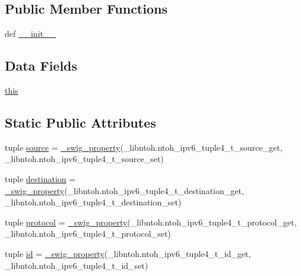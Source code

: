 \subsection*{Public Member Functions}
\begin{DoxyCompactItemize}
\item 
def \hyperlink{classlibntoh_1_1ntoh__ipv6__tuple4__t_ac775ee34451fdfa742b318538164070e}{\-\_\-\-\_\-init\-\_\-\-\_\-}
\end{DoxyCompactItemize}
\subsection*{Data Fields}
\begin{DoxyCompactItemize}
\item 
\hyperlink{classlibntoh_1_1ntoh__ipv6__tuple4__t_a05c09a5e9d53fa7adf0a7936038c2fa3}{this}
\end{DoxyCompactItemize}
\subsection*{Static Public Attributes}
\begin{DoxyCompactItemize}
\item 
tuple \hyperlink{classlibntoh_1_1ntoh__ipv6__tuple4__t_aa873026052cc3e5ba03877243fcb7ecd}{source} = \hyperlink{namespacelibntoh_ae6f5626f776538e0cdb00e75ca1c96c9}{\-\_\-swig\-\_\-property}(\-\_\-libntoh.\-ntoh\-\_\-ipv6\-\_\-tuple4\-\_\-t\-\_\-source\-\_\-get, \-\_\-libntoh.\-ntoh\-\_\-ipv6\-\_\-tuple4\-\_\-t\-\_\-source\-\_\-set)
\item 
tuple \hyperlink{classlibntoh_1_1ntoh__ipv6__tuple4__t_adaac82457baf1096d1c38cadf8123ce7}{destination} = \hyperlink{namespacelibntoh_ae6f5626f776538e0cdb00e75ca1c96c9}{\-\_\-swig\-\_\-property}(\-\_\-libntoh.\-ntoh\-\_\-ipv6\-\_\-tuple4\-\_\-t\-\_\-destination\-\_\-get, \-\_\-libntoh.\-ntoh\-\_\-ipv6\-\_\-tuple4\-\_\-t\-\_\-destination\-\_\-set)
\item 
tuple \hyperlink{classlibntoh_1_1ntoh__ipv6__tuple4__t_ae535ff0dd346855882bd298a9e22bbc1}{protocol} = \hyperlink{namespacelibntoh_ae6f5626f776538e0cdb00e75ca1c96c9}{\-\_\-swig\-\_\-property}(\-\_\-libntoh.\-ntoh\-\_\-ipv6\-\_\-tuple4\-\_\-t\-\_\-protocol\-\_\-get, \-\_\-libntoh.\-ntoh\-\_\-ipv6\-\_\-tuple4\-\_\-t\-\_\-protocol\-\_\-set)
\item 
tuple \hyperlink{classlibntoh_1_1ntoh__ipv6__tuple4__t_a0e43f6071072440917ee2dd8af07d251}{id} = \hyperlink{namespacelibntoh_ae6f5626f776538e0cdb00e75ca1c96c9}{\-\_\-swig\-\_\-property}(\-\_\-libntoh.\-ntoh\-\_\-ipv6\-\_\-tuple4\-\_\-t\-\_\-id\-\_\-get, \-\_\-libntoh.\-ntoh\-\_\-ipv6\-\_\-tuple4\-\_\-t\-\_\-id\-\_\-set)
\end{DoxyCompactItemize}


